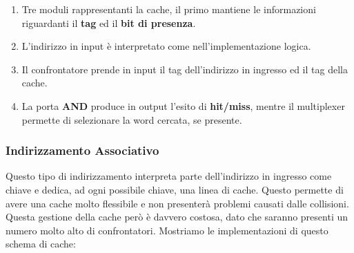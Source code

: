 \documentclass{article}
\begin{document}
\begin{enumerate}
\begin{figure}[htbp]
    \end{figure}
    \begin{enumerate}
        \item Tre moduli rappresentanti la cache, il primo mantiene le informazioni riguardanti il \textbf{tag} ed il \textbf{bit di presenza}.
        \item L'indirizzo in input è interpretato come nell'implementazione logica.
        \item Il confrontatore prende in input il tag dell'indirizzo in ingresso ed il tag della cache.
        \item La porta \textbf{AND} produce in output l'esito di \textbf{hit/miss}, mentre il multiplexer permette di selezionare la word cercata, se presente.
    \end{enumerate}
\end{enumerate}

\newpage

\subsubsection{Indirizzamento Associativo}

Questo tipo di indirizzamento interpreta parte dell'indirizzo in ingresso come chiave e dedica, ad ogni possibile chiave, una linea di cache. Questo permette di avere una cache molto flessibile e non presenterà problemi causati dalle collisioni. Questa gestione della cache però è davvero costosa, dato che saranno presenti un numero molto alto di confrontatori. Mostriamo le implementazioni di questo schema di cache:

\vspace*{15px}
\end{document}
